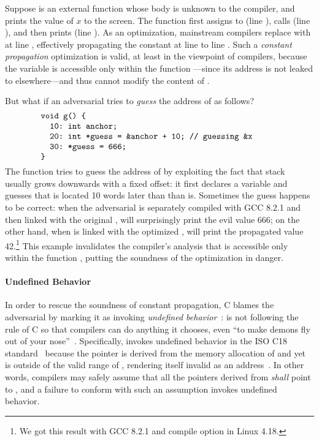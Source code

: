 \noindent Suppose  is an external function whose body is unknown to the compiler, and
 prints the value of $x$ to the screen.  The function  first assigns
 to  (line ), calls  (line ), and then prints 
(line ).  As an optimization, mainstream compilers replace  with  at line
, effectively propagating the constant  at line  to line .  Such
a \emph{constant propagation} optimization is valid, at least in the viewpoint of compilers, because
the variable  is accessible only within the function ---since its address is not
leaked to elsewhere---and thus  cannot modify the content of .

But what if an adversarial  tries to \emph{guess} the address of  as follows?
%
\[
\begin{minipage}{0.8\textwidth}
\begin{verbatim}
void g() {
  10: int anchor;
  20: int *guess = &anchor + 10; // guessing &x
  30: *guess = 666;
}
\end{verbatim}
\end{minipage}
\]
%
\noindent The function  tries to guess the address of  by exploiting the fact that
stack usually grows downwards with a fixed offset: it first declares a variable  and
guesses that  is located 10 words later than than  is.  Sometimes the guess
happens to be correct: when the adversarial  is separately compiled with GCC 8.2.1 and
then linked with the original ,  will surprisingly print the evil value 666; on
the other hand, when  is linked with the optimized ,  will print the
propagated value 42.\footnote{We got this result with GCC 8.2.1 and compile option
   in Linux 4.18.} This example invalidates the compiler's analysis that
 is accessible only within the function , putting the soundness of the
optimization in danger.


\paragraph{Undefined Behavior}

In order to rescue the soundness of constant propagation, C blames the adversarial  by
marking it as invoking \emph{undefined behavior}~\cite{undefined-behavior}:  is not
following the rule of C so that compilers can do anything it chooses, \eg{} even ``to make demons
fly out of your nose''~\cite{nasal-demons}.  Specifically,  invokes undefined behavior in
the ISO C18 standard~\cite{c18} because the pointer  is derived from the memory
allocation of  and yet is outside of the valid range of , rendering itself
invalid as an address~\cite{c11-6.5.6p8}.  In other words, compilers may safely assume that all the
pointers derived from  \emph{shall} point to , and a failure to conform
with such an assumption invokes undefined behavior.

